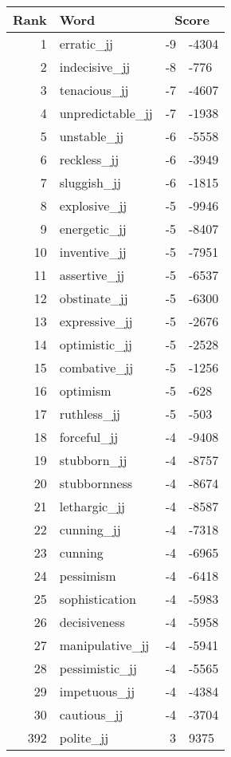 \begin{longtable}[!htbp]{| rlr@{.}l |}
    \hline
    \textbf{Rank} & \textbf{Word} & \multicolumn{2}{c|}{\textbf{Score}} \\
    \hline
    \endhead
    1 & erratic\_jj & -9 & -4304 \\
    2 & indecisive\_jj & -8 & -776 \\
    3 & tenacious\_jj & -7 & -4607 \\
    4 & unpredictable\_jj & -7 & -1938 \\
    5 & unstable\_jj & -6 & -5558 \\
    6 & reckless\_jj & -6 & -3949 \\
    7 & sluggish\_jj & -6 & -1815 \\
    8 & explosive\_jj & -5 & -9946 \\
    9 & energetic\_jj & -5 & -8407 \\
    10 & inventive\_jj & -5 & -7951 \\
    11 & assertive\_jj & -5 & -6537 \\
    12 & obstinate\_jj & -5 & -6300 \\
    13 & expressive\_jj & -5 & -2676 \\
    14 & optimistic\_jj & -5 & -2528 \\
    15 & combative\_jj & -5 & -1256 \\
    16 & optimism & -5 & -628 \\
    17 & ruthless\_jj & -5 & -503 \\
    18 & forceful\_jj & -4 & -9408 \\
    19 & stubborn\_jj & -4 & -8757 \\
    20 & stubbornness & -4 & -8674 \\
    21 & lethargic\_jj & -4 & -8587 \\
    22 & cunning\_jj & -4 & -7318 \\
    23 & cunning & -4 & -6965 \\
    24 & pessimism & -4 & -6418 \\
    25 & sophistication & -4 & -5983 \\
    26 & decisiveness & -4 & -5958 \\
    27 & manipulative\_jj & -4 & -5941 \\
    28 & pessimistic\_jj & -4 & -5565 \\
    29 & impetuous\_jj & -4 & -4384 \\
    30 & cautious\_jj & -4 & -3704 \\
    392 & polite\_jj & 3 & 9375 \\

\end{longtable}
